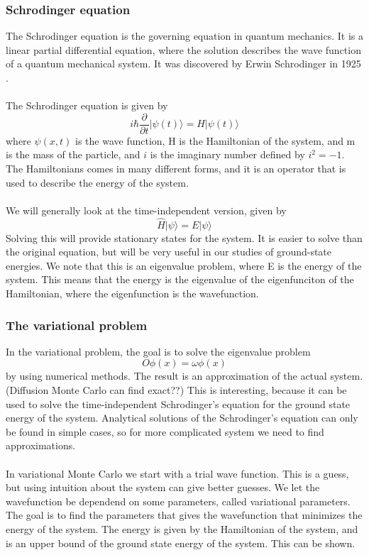 \subsubsection{Schrodinger equation}
The Schrodinger equation is the governing equation in quantum mechanics. It is a linear partial differential equation, where the solution describes the wave function of a quantum mechanical system. It was discovered by Erwin Schrodinger in 1925 \cite{}. 
\\
\\
The Schrodinger equation is given by
\begin{equation}
    i\hbar \frac{\partial }{\partial t}|\psi(t)\rangle = H|\psi(t)\rangle
\end{equation}
where $\psi(x,t)$ is the wave function, H is the Hamiltonian of the system, and m is the mass of the particle, and $i$ is the imaginary number defined by $i^2 = -1$. The Hamiltonians comes in many different forms, and it is an operator that is used to describe the energy of the system. 
\\
\\
We will generally look at the time-independent version, given by
\begin{equation}
    \hat{H}|\psi\rangle = E|\psi\rangle
\end{equation}
Solving this will provide stationary states for the system. It is easier to solve than the original equation, but will be very useful in our studies of ground-state energies. 
We note that this is an eigenvalue problem, where E is the energy of the system. This means that the energy is the eigenvalue of the eigenfunciton of the Hamiltonian, where the eigenfunction is the wavefunction. 

\subsubsection{The variational problem}
In the variational problem, the goal is to solve the eigenvalue problem
\begin{equation}
    O\phi(x) = \omega \phi(x)
\end{equation}
by using numerical methods. The result is an approximation of the actual system. (Diffusion Monte Carlo can find exact??) This is interesting, because it can be used to solve the time-independent Schrodinger's equation for the ground state energy of the system. Analytical solutions of the Schrodinger's equation can only be found in simple cases, so for more complicated system we need to find approximations. 
\\
\\
In variational Monte Carlo we start with a trial wave function. This is a guess, but using intuition about the system can give better guesses. We let the wavefunction be dependend on some parameters, called variational parameters. The goal is to find the parameters that gives the wavefunction that minimizes the energy of the system. The energy is given by the Hamiltonian of the system, and is an upper bound of the ground state energy of the system. This can be shown.  
